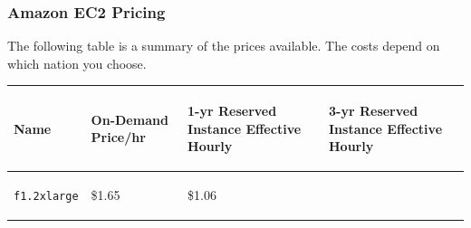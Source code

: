 \documentclass[a4paper]{article}
\begin{document}
    \subsubsection{Amazon EC2 Pricing}
    
    The following table is a summary of the prices available. The costs depend on which nation you choose.

    \begin{table}[!htp]
        \centering
        \begin{tabular}{@{} p{5em} p{7em} p{9.5em} p{9.5em} @{}}
            \toprule
            \begin{center}
                \textbf{Name}
            \end{center}
            & \begin{center}
                \vspace{-1.5em}
                \textbf{On-Demand Price/hr}
                \vspace{-1em}
            \end{center} 
            & \begin{center}
                \vspace{-1.5em}
                \textbf{1-yr Reserved Instance Effective Hourly}
                \vspace{-1em}
            \end{center}
            & \begin{center}
                \vspace{-1.5em}
                \textbf{3-yr Reserved Instance Effective Hourly}
                \vspace{-1em}
            \end{center} \\
            \midrule
            \begin{center}
                \vspace{-1.9em}
                \texttt{f1.2xlarge}
            \end{center} &
            \begin{center}
                \vspace{-1.5em}
                \$1.65
            \end{center} & 
            \begin{center}
                \vspace{-1.5em}
                \$1.06
            \end{center} & 
            \begin{center}

\end{center}
\end{tabular}
\end{table}
\end{document}

